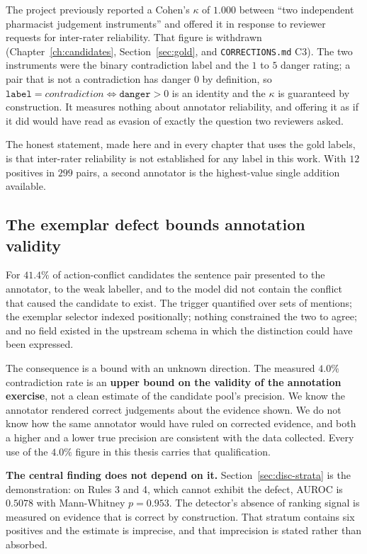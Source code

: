 The project previously reported a Cohen's $\kappa$ of $1.000$ between ``two
independent pharmacist judgement instruments'' and offered it in response to
reviewer requests for inter-rater reliability. That figure is withdrawn
(Chapter~\ref{ch:candidates}, Section~\ref{sec:gold}, and
\texttt{CORRECTIONS.md} C3). The two instruments were the binary contradiction
label and the $1$ to $5$ danger rating; a pair that is not a contradiction has
danger $0$ by definition, so
$\texttt{label} = \textit{contradiction} \iff \texttt{danger} > 0$ is an
identity and the $\kappa$ is guaranteed by construction. It measures nothing
about annotator reliability, and offering it as if it did would have read as
evasion of exactly the question two reviewers asked.

The honest statement, made here and in every chapter that uses the gold labels,
is that inter-rater reliability is not established for any label in this work.
With $12$ positives in $299$ pairs, a second annotator is the highest-value
single addition available.

\subsection{The exemplar defect bounds annotation validity}

For $41.4\%$ of action-conflict candidates the sentence pair presented to the
annotator, to the weak labeller, and to the model did not contain the conflict
that caused the candidate to exist. The trigger quantified over sets of
mentions; the exemplar selector indexed positionally; nothing constrained the
two to agree; and no field existed in the upstream schema in which the
distinction could have been expressed.

The consequence is a bound with an unknown direction. The measured $4.0\%$
contradiction rate is an \textbf{upper bound on the validity of the annotation
exercise}, not a clean estimate of the candidate pool's precision. We know the
annotator rendered correct judgements about the evidence shown. We do not know
how the same annotator would have ruled on corrected evidence, and both a higher
and a lower true precision are consistent with the data collected. Every use of
the $4.0\%$ figure in this thesis carries that qualification.

\textbf{The central finding does not depend on it.}
Section~\ref{sec:disc-strata} is the demonstration: on Rules 3 and 4, which
cannot exhibit the defect, AUROC is $0.5078$ with Mann-Whitney $p = 0.953$. The
detector's absence of ranking signal is measured on evidence that is correct by
construction. That stratum contains six positives and the estimate is imprecise,
and that imprecision is stated rather than absorbed.

